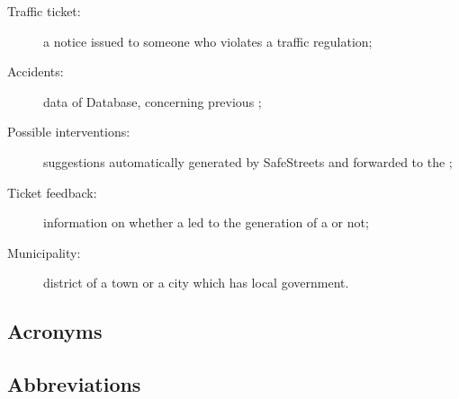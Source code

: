 \documentclass[../../DD.tex]{subfiles}
\begin{document}
\begin{description}
	\item[Traffic ticket:] a notice issued to someone who violates a traffic regulation;
	\item[Accidents:] data of  Database, concerning previous ;
	\item[Possible interventions:] suggestions automatically generated by SafeStreets and forwarded to the ;
	\item[Ticket feedback:] information on whether a  led to the generation of a  or not;
	\item[Municipality:] district of a town or a city which has local government.
\end{description}

\subsection{Acronyms\label{sect:1.3.2}}

\subsection{Abbreviations\label{sect:1.3.3}}
\end{document}
